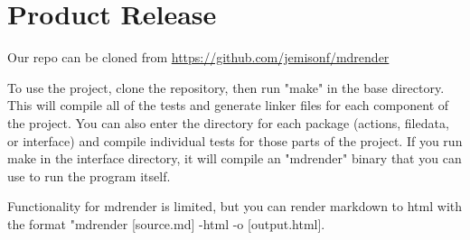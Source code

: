 \section{Product Release}

Our repo can be cloned from \url{https://github.com/jemisonf/mdrender}

To use the project, clone the repository, then run "make" in the base directory. This will compile all of the tests and generate linker files for each component of the project. You can also enter the directory for each package (actions, filedata, or interface) and compile individual tests for those parts of the project. If you run make in the interface directory, it will compile an "mdrender" binary that you can use to run the program itself.

Functionality for mdrender is limited, but you can render markdown to html with the format "mdrender [source.md] -html -o [output.html].